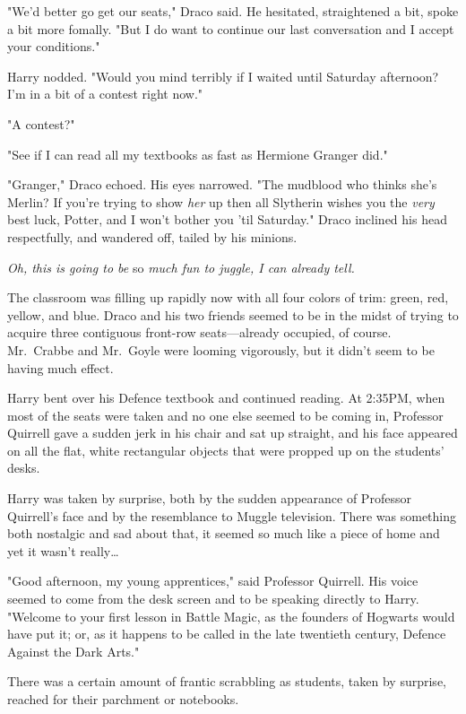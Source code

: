 "We'd better go get our seats," Draco said. He hesitated, straightened a bit, 
spoke a bit more fomally. "But I do want to continue our last conversation and 
I accept your conditions."

Harry nodded. "Would you mind terribly if I waited until Saturday afternoon? 
I'm in a bit of a contest right now."

"A contest?"

"See if I can read all my textbooks as fast as Hermione Granger did."

"Granger," Draco echoed. His eyes narrowed. "The mudblood who thinks she's 
Merlin? If you're trying to show \emph{her} up then all Slytherin wishes you 
the \emph{very} best luck, Potter, and I won't bother you 'til Saturday." Draco 
inclined his head respectfully, and wandered off, tailed by his minions.

\emph{Oh, this is going to be} so\emph{ much fun to juggle, I can already tell.}

The classroom was filling up rapidly now with all four colors of trim: green, 
red, yellow, and blue. Draco and his two friends seemed to be in the midst of 
trying to acquire three contiguous front-row seats---already occupied, of 
course. Mr.~Crabbe and Mr.~Goyle were looming vigorously, but it didn't seem to 
be having much effect.

Harry bent over his Defence textbook and continued reading.
\sbreak
At 2:35PM, when most of the seats were taken and no one else seemed to be 
coming in, Professor Quirrell gave a sudden jerk in his chair and sat up 
straight, and his face appeared on all the flat, white rectangular objects that 
were propped up on the students' desks.

Harry was taken by surprise, both by the sudden appearance of Professor 
Quirrell's face and by the resemblance to Muggle television. There was 
something both nostalgic and sad about that, it seemed so much like a piece of 
home and yet it wasn't really{\ldots}

"Good afternoon, my young apprentices," said Professor Quirrell. His voice 
seemed to come from the desk screen and to be speaking directly to Harry. 
"Welcome to your first lesson in Battle Magic, as the founders of Hogwarts 
would have put it; or, as it happens to be called in the late twentieth 
century, Defence Against the Dark Arts."

There was a certain amount of frantic scrabbling as students, taken by 
surprise, reached for their parchment or notebooks.

